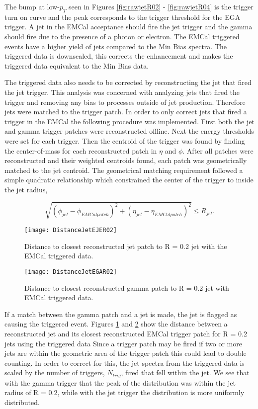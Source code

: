 The bump at low-$p_{T}$ seen in Figures \ref{fig:rawjetR02} - \ref{fig:rawjetR04} is the trigger turn on curve and the peak corresponds to the trigger threshold for the EGA trigger.  A jet in the EMCal acceptance should fire the jet trigger and the gamma should fire due to the presence of a photon or electron. The EMCal triggered events have a higher yield of jets compared to the Min Bias spectra. The triggered data is downscaled, this corrects the enhancement and makes the triggered data equivalent to the Min Bias data.  

The triggered data also needs to be corrected by reconstructing the jet that fired the jet trigger.  This analysis was concerned with analyzing jets that fired the trigger and removing any bias to processes outside of jet production. Therefore jets were matched to the trigger patch.  In order to only correct jets that fired a trigger in the EMCal the following procedure was implemented.  First both the jet and gamma trigger patches were reconstructed offline.  Next the energy thresholds were set for each trigger.  Then the centroid of the trigger was found by finding the center-of-mass for each reconstructed patch in $\eta$ and $\phi$.  After all patches were reconstructed and their weighted centroids found, each patch was geometrically matched to the jet centroid.  The geometrical matching requirement followed a simple quadratic relationship which constrained the center of the trigger to inside the jet radius,

\begin{equation}
\sqrt{ ( \phi_{jet} - \phi_{EMCal patch} )^{2} + ( \eta_{jet} - \eta_{EMCal patch} )^{2}}  \leq R_{jet} .
\label{eq:triggermatch}
\end{equation}

\begin{figure}[h]
\texttt{[image: DistanceJetEJER02]}
\centering
\caption{Distance to closest reconstructed jet patch to R = 0.2 jet with the EMCal triggered data.}
\label{fig:DisJetEJE}
\end{figure}

\begin{figure}[h]
\texttt{[image: DistanceJetEGAR02]}
\centering
\caption{Distance to closest reconstructed gamma patch to R = 0.2 jet with EMCal triggered data.}
\label{fig:DisJetEGA}
\end{figure}

\noindent
If a match between the gamma patch and a jet is made, the jet is flagged as causing the triggered event.  Figures \ref{fig:DisJetEJE} and \ref{fig:DisJetEGA} show the distance between a reconstructed jet and its closest reconstructed EMCal trigger patch for R = 0.2 jets using the triggered data  Since a trigger patch may be fired if two or more jets are within the geometric area of the trigger patch this could lead to double counting.  In order to correct for this, the jet spectra from the triggered data is scaled by the number of triggers, $N_{trig}$, fired that fell within the jet.  We see that with the gamma trigger that the peak of the distribution was within the jet radius of R = 0.2, while with the jet trigger the distribution is more uniformly distributed. 

